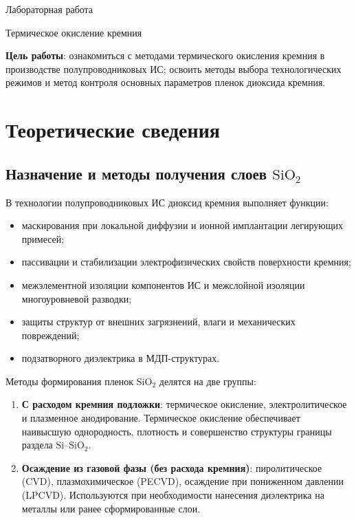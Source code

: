 \documentclass[12pt,a4paper]{article}
\theoremstyle{plain}
\theoremstyle{definition}
\theoremstyle{remark}
\numberwithin{equation}{section}
\begin{document}
\begin{center}
    \Large Лабораторная работа 
\end{center}

\begin{center}
    \large Термическое окисление кремния
\end{center}

\textbf{Цель работы}: ознакомиться с методами термического окисления кремния в производстве полупроводниковых ИС; освоить методы выбора технологических режимов и метод контроля основных параметров пленок диоксида кремния.

\section{Теоретические сведения}

\subsection{Назначение и методы получения слоев $\mathrm{SiO}_2$}

В технологии полупроводниковых ИС диоксид кремния выполняет функции:
\begin{itemize}
    \item маскирования при локальной диффузии и ионной имплантации легирующих примесей;
    \item пассивации и стабилизации электрофизических свойств поверхности кремния;
    \item межэлементной изоляции компонентов ИС и межслойной изоляции многоуровневой разводки;
    \item защиты структур от внешних загрязнений, влаги и механических повреждений;
    \item подзатворного диэлектрика в МДП-структурах.
\end{itemize}

Методы формирования пленок $\mathrm{SiO}_2$ делятся на две группы:
\begin{enumerate}
    \item \textbf{С расходом кремния подложки}: термическое окисление, электролитическое и плазменное анодирование. Термическое окисление обеспечивает наивысшую однородность, плотность и совершенство структуры границы раздела $\mathrm{Si}\text{--}\mathrm{SiO}_2$.
    \item \textbf{Осаждение из газовой фазы (без расхода кремния)}: пиролитическое (CVD), плазмохимическое (PECVD), осаждение при пониженном давлении (LPCVD). Используются при необходимости нанесения диэлектрика на металлы или ранее сформированные слои.
\end{enumerate}
\end{document}
